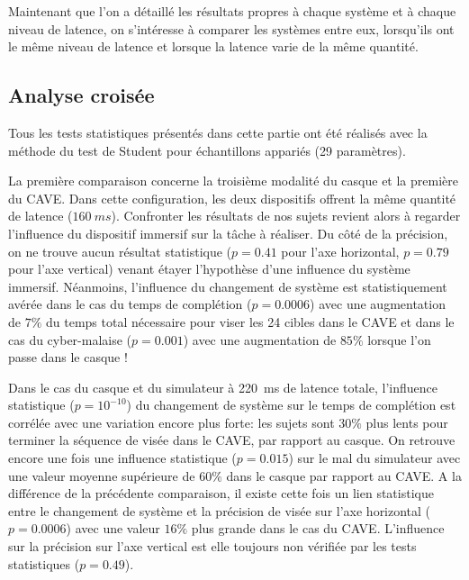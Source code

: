 	\par Maintenant que l'on a détaillé les résultats propres à chaque système et à chaque niveau de latence, on s'intéresse à comparer les systèmes entre eux, lorsqu'ils ont le même niveau de latence et lorsque la latence varie de la même quantité.
	
	\subsection{Analyse croisée}
	\par Tous les tests statistiques présentés dans cette partie ont été réalisés avec la méthode du test de Student pour échantillons appariés (29 paramètres).	
	
	\par La première comparaison concerne la troisième modalité du casque et la première du CAVE. Dans cette configuration, les deux dispositifs offrent la même quantité de latence ($160~ms$). Confronter les résultats de nos sujets revient alors à regarder l'influence du dispositif immersif sur la tâche à réaliser. Du côté de la précision, on ne trouve aucun résultat statistique ($p = 0.41$ pour l'axe horizontal, $p = 0.79$ pour l'axe vertical) venant étayer l'hypothèse d'une influence du système immersif. Néanmoins, l'influence du changement de système est statistiquement avérée dans le cas du temps de complétion ($p = 0.0006$) avec une augmentation de $7\%$ du temps total nécessaire pour viser les 24 cibles dans le CAVE et dans le cas du cyber-malaise ($p = 0.001$) avec une augmentation de $85\%$ lorsque l'on passe dans le casque !
	
	\par Dans le cas du casque et du simulateur à 220~ms de latence totale, l'influence statistique ($p = 10^{-10}$) du changement de système sur le temps de complétion est corrélée avec une variation encore plus forte: les sujets sont $30\%$ plus lents pour terminer la séquence de visée dans le CAVE, par rapport au casque. On retrouve encore une fois une influence statistique ($p = 0.015$) sur le mal du simulateur avec une valeur moyenne supérieure de $60\%$ dans le casque par rapport au CAVE. A la différence de la précédente comparaison, il existe cette fois un lien statistique entre le changement de système et la précision de visée sur l'axe horizontal ($p = 0.0006$) avec une valeur $16\%$ plus grande dans le cas du CAVE. L'influence sur la précision sur l'axe vertical est elle toujours non vérifiée par les tests statistiques ($p = 0.49$).
	
